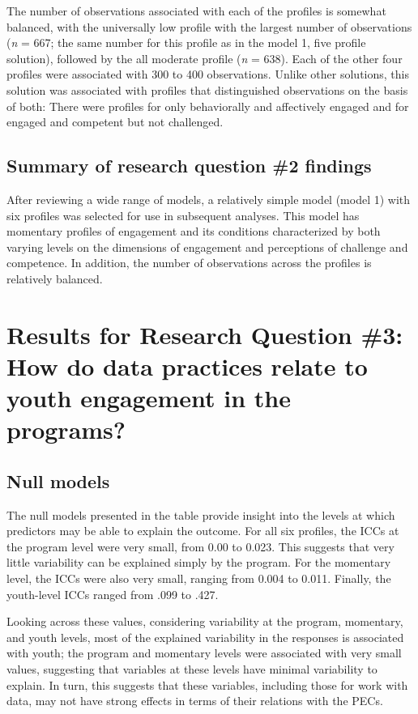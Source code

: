 \documentclass[]{book}
\theoremstyle{definition}
\theoremstyle{definition}
\theoremstyle{definition}
\theoremstyle{remark}
\begin{document}
The number of observations associated with each of the profiles is
somewhat balanced, with the universally low profile with the largest
number of observations (\emph{n} = 667; the same number for this profile
as in the model 1, five profile solution), followed by the all moderate
profile (\emph{n} = 638). Each of the other four profiles were
associated with 300 to 400 observations. Unlike other solutions, this
solution was associated with profiles that distinguished observations on
the basis of both: There were profiles for only behaviorally and
affectively engaged and for engaged and competent but not challenged.

\subsection{Summary of research question \#2
findings}\label{summary-of-research-question-2-findings}

After reviewing a wide range of models, a relatively simple model (model
1) with six profiles was selected for use in subsequent analyses. This
model has momentary profiles of engagement and its conditions
characterized by both varying levels on the dimensions of engagement and
perceptions of challenge and competence. In addition, the number of
observations across the profiles is relatively balanced.

\section{Results for Research Question \#3: How do data practices relate
to youth engagement in the
programs?}\label{results-for-research-question-3-how-do-data-practices-relate-to-youth-engagement-in-the-programs}

\subsection{Null models}\label{null-models}

The null models presented in the table provide insight into the levels
at which predictors may be able to explain the outcome. For all six
profiles, the ICCs at the program level were very small, from 0.00 to
0.023. This suggests that very little variability can be explained
simply by the program. For the momentary level, the ICCs were also very
small, ranging from 0.004 to 0.011. Finally, the youth-level ICCs ranged
from .099 to .427.

Looking across these values, considering variability at the program,
momentary, and youth levels, most of the explained variability in the
responses is associated with youth; the program and momentary levels
were associated with very small values, suggesting that variables at
these levels have minimal variability to explain. In turn, this suggests
that these variables, including those for work with data, may not have
strong effects in terms of their relations with the PECs.
\end{document}
